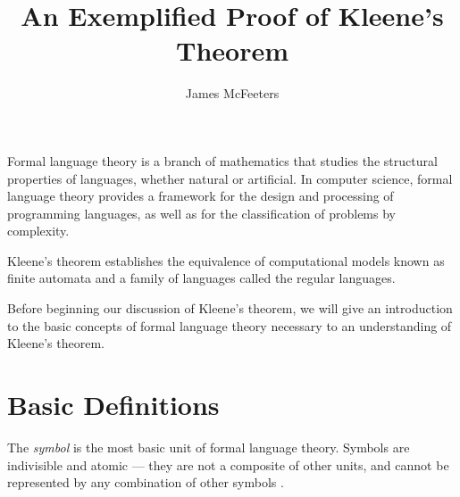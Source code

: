\documentclass{bcthesis}
\title{An Exemplified Proof of Kleene's Theorem}
\author{James McFeeters}
\newif\ifbuildfrontmatter
\newcommand{\footcite}[2]{\xspace\cite[pg.~{#2}]{#1}\xspace}
\begin{document}
\ifbuildfrontmatter
\frontmatter

	\maketitle

	\begin{abstract}
		This paper offers a proof of Kleene's theorem, accompanied by the necessary background in formal language theory, as well as detailed examples illustrating key points. 
		There is also a brief discussion of the importance and application of Kleene's theorem in practice.		
	\end{abstract}


	\begin{acknowledgments}
		I thank Darrah Chavey for his capable advising and for introducing me to the topic.
		I thank Cameron Kuchta for proofreading my paper, and Simon Tomlinson for proofreading my paper and assisting me in writing the program used to produce examples.
	\end{acknowledgments}

	\tableofcontents
\fi

\mainmatter
{}
\label{ch:basics}

	Formal language theory is a branch of mathematics that studies the structural properties of languages, whether natural or artificial.
	In computer science, formal language theory provides a framework for the design and processing of programming languages, as well as for the classification of problems by complexity.

	Kleene's theorem establishes the equivalence of computational models known as finite automata and a family of languages called the regular languages.

	Before beginning our discussion of Kleene's theorem, we will give an introduction to the basic concepts of formal language theory necessary to an understanding of Kleene's theorem.

	\section{Basic Definitions} %
	\label{sec:basic_definitions}
		\begin{definition}[Symbol]
			The \textit{symbol} is the most basic unit of formal language theory.
			Symbols are indivisible and atomic --- they are not a composite of other units, and cannot be represented by any combination of other symbols \footcite{hopcroft}{1}.
		\end{definition}
\end{document}
